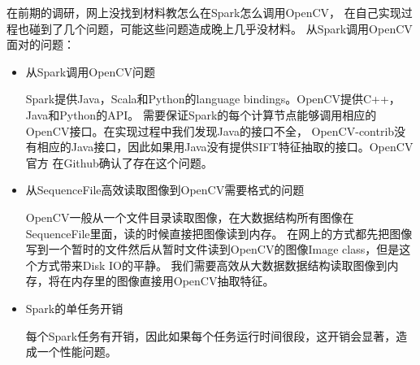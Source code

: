 在前期的调研，网上没找到材料教怎么在Spark怎么调用OpenCV，
在自己实现过程也碰到了几个问题，可能这些问题造成晚上几乎没材料。
从Spark调用OpenCV面对的问题：
\begin{itemize}
  \item 从Spark调用OpenCV问题

        Spark提供Java，Scala和Python的language bindings。OpenCV提供C++，Java和Python的API。
        需要保证Spark的每个计算节点能够调用相应的OpenCV接口。在实现过程中我们发现Java的接口不全，
        OpenCV-contrib没有相应的Java接口，因此如果用Java没有提供SIFT特征抽取的接口。OpenCV官方
        在Github确认了存在这个问题。
  \item 从SequenceFile高效读取图像到OpenCV需要格式的问题

        OpenCV一般从一个文件目录读取图像，在大数据结构所有图像在SequenceFile里面，读的时候直接把图像读到内存。
        在网上的方式都先把图像写到一个暂时的文件然后从暂时文件读到OpenCV的图像Image class，但是这个方式带来Disk IO的平静。
        我们需要高效从大数据数据结构读取图像到内存，将在内存里的图像直接用OpenCV抽取特征。
  \item Spark的单任务开销

        每个Spark任务有开销，因此如果每个任务运行时间很段，这开销会显著，造成一个性能问题。
\end{itemize}

